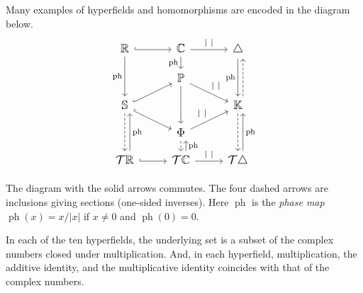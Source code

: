 \documentclass[10pt, preprint]{article}
\theoremstyle{definition}
\begin{document}
Many examples of hyperfields and homomorphisms are encoded in the
diagram below.
%
\begin{equation}
\label{3-by-3}
\large
\begin{tikzcd}
[row sep=small] \mathbb R\arrow[r, hook] \arrow[dd,
"\operatorname{ph}"'] &\mathbb C\arrow[r, "|~|"] \arrow[d,
"\operatorname{ph}"'] & \triangle \arrow[dd, "\operatorname{ph}"'] \\
&\mathbb P\arrow[dd]\arrow[rd,"|~|"]&\\ \mathbb S\arrow[ru,
hook]\arrow[rd,hook] \arrow[dd, dashed] & & \mathbb K\arrow[dd, dashed]
\arrow[uu, shift right=1ex, dashed] \\ & \Phi \arrow[ru, "|~|"]
\arrow[d, dashed]&\\ {\mathcal T }\mathbb R\arrow[r, hook] \arrow[uu, shift
right= 1ex, "\operatorname{ph}"'] & {\mathcal T }\mathbb C\arrow[r, "|~|"]
\arrow[u, shift right=1ex, "\operatorname{ph}"']&{\mathcal T}
\triangle \arrow[uu, shift right=1ex, "\operatorname{ph}"']
\end{tikzcd}
%
\end{equation}

The diagram with the solid arrows commutes. The four dashed arrows are
inclusions giving sections (one-sided inverses). Here $
\operatorname{ph}$ is the \emph{phase map} $\operatorname{ph}(x) = x/|x|$
if $x \neq 0$ and $\operatorname{ph}(0) = 0$.

In each of the ten hyperfields, the underlying set is a subset of the
complex numbers closed under multiplication. And, in
each hyperfield, multiplication, the additive identity, and the
multiplicative identity coincides with that of the complex numbers.
\end{document}
